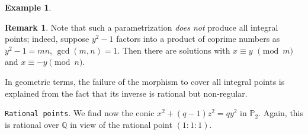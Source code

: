 \documentclass[leqno,12pt]{article} %
\def\Z{{{\mathbb Z}}}
\def\Q{{{\mathbb Q}}}
\def\P{{{\mathbb P}}}
\theoremstyle{plain} %
\theoremstyle{definition} %
\newtheorem{remark}[theorem]{\indent\sc Remark}
\newtheorem{example}[theorem]{\indent\sc Example}
\begin{document}
\begin{example}
\begin{remark}
Note that such a parametrization {\it does not} produce all integral points; indeed, suppose $y^2-1$ factors into a product of coprime numbers as $y^2-1=mn$, $\gcd(m,n)=1$. Then there are  solutions with $x\equiv y$ $\pmod m$ and $x\equiv -y\pmod n$. 

In geometric terms, the failure of the morphism to cover all integral points is explained from the fact that its inverse is    rational but non-regular.  
\end{remark}

 {\tt Rational points}. We find now the conic $x^2+(q-1)z^2=qy^2$ in $\P_2$.  Again, this is rational over $\Q$ in view of the rational point $(1:1:1)$.
 \end{example}
  
  
  
  
  
  
  
 
 
\end{document}
